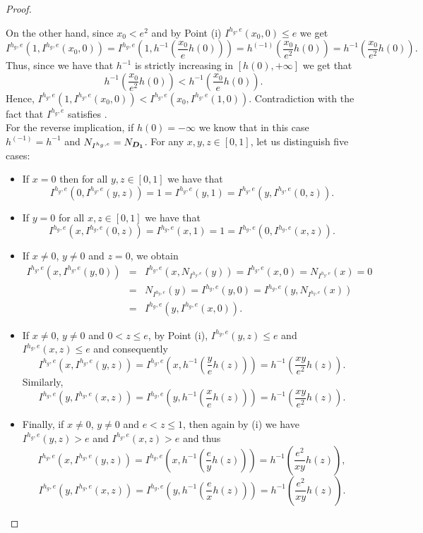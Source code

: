 \begin{proof}
\begin{enumerate}[label=(\roman*)]
		On the other hand, since $x_0<e^2$ and by Point (i) $I^{h_g,e}(x_0,0) \leq e$ we get 
		$$I^{h_g,e}(1,I^{h_g,e}(x_0,0)) = I^{h_g,e}\left(1,h^{-1}\left(\frac{x_0}{e}h(0)\right)\right)
		=h^{(-1)}\left(\frac{x_0}{e^2}h(0)\right) = h^{-1}\left(\frac{x_0}{e^2}h(0)\right).
		$$
		Thus, since we have that $h^{-1}$ is strictly increasing in $[h(0),+\infty]$ we get that 
		$$ h^{-1}\left(\frac{x_0}{e^2}h(0) \right) < h^{-1}\left(\frac{x_0}{e}h(0) \right).$$
		Hence, $I^{h_g,e}(1,I^{h_g,e}(x_0,0)) < I^{h_g,e}(x_0,I^{h_g,e}(1,0))$. Contradiction with the fact that $I^{h_g,e}$ satisfies \EP.\\
		For the reverse implication, if $h(0)=-\infty$ we know that in this case $h^{(-1)}=h^{-1}$ and $N_{I^{h_g,e}}=N_{\bm{D_1}}$. For any $x,y,z \in [0,1]$, let us distinguish five cases:
		\begin{itemize}
			\item If $x=0$ then for all $y,z \in [0,1]$ we have that
			$$I^{h_g,e}(0,I^{h_g,e}(y,z))=1=I^{h_g,e}(y,1)= I^{h_g,e}(y,I^{h_g,e}(0,z)).$$
			\item If $y=0$ for all $x,z \in [0,1]$ we have that
			$$I^{h_g,e}(x,I^{h_g,e}(0,z))=I^{h_g,e}(x,1)= 1=I^{h_g,e}(0,I^{h_g,e}(x,z)).$$
			\item If $ x \not = 0$, $y \not = 0$ and $z=0$, we obtain
			\begin{eqnarray*}
				I^{h_g,e}(x,I^{h_g,e}(y,0))&=&I^{h_g,e}(x,N_{I^{h_g,e}}(y))= I^{h_g,e}(x,0)=N_{I^{h_g,e}}(x)=0 \\
				&=&N_{I^{h_g,e}}(y)=I^{h_g,e}(y,0)=I^{h_g,e}(y,N_{I^{h_g,e}}(x))\\
				&=&I^{h_g,e}(y,I^{h_g,e}(x,0)).
			\end{eqnarray*}
			\item If $x \not = 0$, $y \not = 0$ and $0<z \leq e$, by Point (i), $I^{h_g,e}(y,z) \leq e$ and $I^{h_g,e}(x,z) \leq e$  and consequently
			$$I^{h_g,e}(x,I^{h_g,e}(y,z))=I^{h_g,e}\left(x,h^{-1}\left(\frac{y}{e}h(z)\right)\right) = h^{-1}\left(\frac{xy}{e^2}h(z)\right).$$
			Similarly,
			$$I^{h_g,e}(y,I^{h_g,e}(x,z))=I^{h_g,e}\left(y,h^{-1}\left(\frac{x}{e}h(z)\right)\right) = h^{-1}\left(\frac{xy}{e^2}h(z)\right).$$
			\item Finally, if $x \not = 0$, $y \not = 0$ and $e<z\leq 1$, then again by (i) we have $I^{h_g,e}(y,z)>e$ and $I^{h_g,e}(x,z)>e$ and thus
			$$I^{h_g,e}(x,I^{h_g,e}(y,z))=I^{h_g,e}\left(x,h^{-1}\left(\frac{e}{y}h(z)\right)\right) = h^{-1}\left(\frac{e^2}{xy}h(z)\right),$$
			$$I^{h_g,e}(y,I^{h_g,e}(x,z))=I^{h_g,e}\left(y,h^{-1}\left(\frac{e}{x}h(z)\right)\right) = h^{-1}\left(\frac{e^2}{xy}h(z)\right).$$

\end{itemize}
\end{enumerate}
\end{proof}
